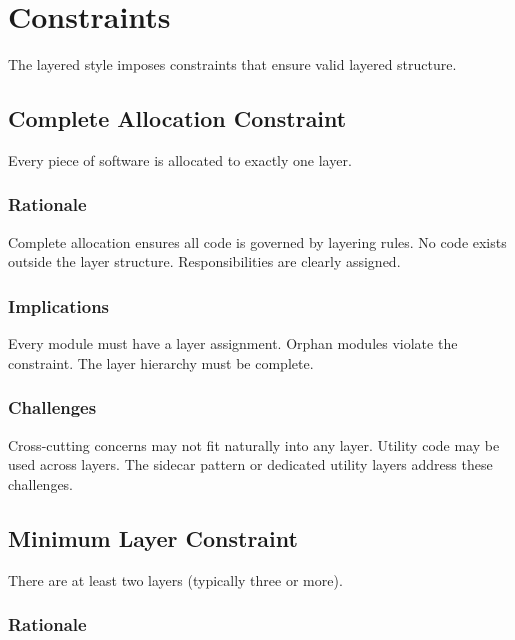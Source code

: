 \documentclass[11pt]{article}
\begin{document}
\section{Constraints}

The layered style imposes constraints that ensure valid layered structure.

\subsection{Complete Allocation Constraint}

Every piece of software is allocated to exactly one layer.

\subsubsection{Rationale}

Complete allocation ensures all code is governed by layering rules. No code exists outside the layer structure. Responsibilities are clearly assigned.

\subsubsection{Implications}

Every module must have a layer assignment. Orphan modules violate the constraint. The layer hierarchy must be complete.

\subsubsection{Challenges}

Cross-cutting concerns may not fit naturally into any layer. Utility code may be used across layers. The sidecar pattern or dedicated utility layers address these challenges.

\subsection{Minimum Layer Constraint}

There are at least two layers (typically three or more).

\subsubsection{Rationale}
\end{document}

